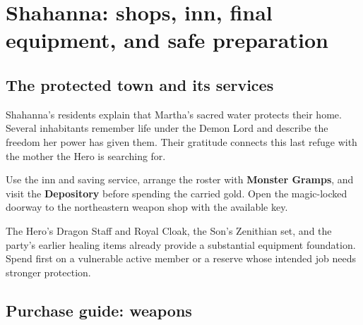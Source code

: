 
\section{Shahanna: shops, inn, final equipment, and safe preparation}

\subsection*{The protected town and its services}

Shahanna's residents explain that Martha's sacred water protects
their home. Several inhabitants remember life under the Demon Lord
and describe the freedom her power has given them. Their gratitude
connects this last refuge with the mother the Hero is searching for.

Use the inn and saving service, arrange the roster with
\textbf{Monster Gramps}, and visit the \textbf{Depository}
before spending the carried gold. Open the magic-locked doorway
to the northeastern weapon shop with the available key.

The Hero's Dragon Staff and Royal Cloak, the Son's Zenithian set,
and the party's earlier healing items already provide a substantial
equipment foundation. Spend first on a vulnerable active member
or a reserve whose intended job needs stronger protection.

\subsection*{Purchase guide: weapons}

